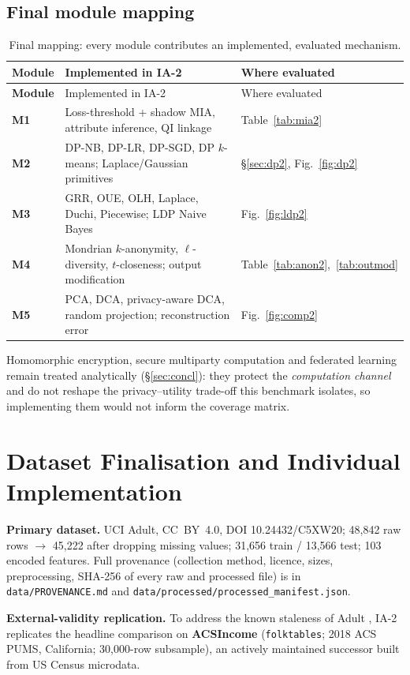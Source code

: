 \documentclass[11pt,a4paper]{article}
\begin{document}
\subsection{Final module mapping}
\begin{longtable}{>{\bfseries}p{1.4cm}p{7.4cm}p{4.3cm}}
\caption{Final mapping: every module contributes an implemented, evaluated mechanism.}\label{tab:map2}\\
\toprule Module & Implemented in IA-2 & Where evaluated\\ \midrule
\endfirsthead \toprule Module & Implemented in IA-2 & Where evaluated\\ \midrule \endhead
M1 & Loss-threshold + shadow MIA, attribute inference, QI linkage & Table~\ref{tab:mia2}\\
M2 & DP-NB, DP-LR, DP-SGD, DP $k$-means; Laplace/Gaussian primitives & \S\ref{sec:dp2}, Fig.~\ref{fig:dp2}\\
M3 & GRR, OUE, OLH, Laplace, Duchi, Piecewise; LDP Naive Bayes & Fig.~\ref{fig:ldp2}\\
M4 & Mondrian $k$-anonymity, $\ell$-diversity, $t$-closeness; output modification & Table~\ref{tab:anon2},~\ref{tab:outmod}\\
M5 & PCA, DCA, privacy-aware DCA, random projection; reconstruction error & Fig.~\ref{fig:comp2}\\
\bottomrule
\end{longtable}
Homomorphic encryption, secure multiparty computation and federated learning
remain treated analytically (\S\ref{sec:concl}): they protect the \emph{computation
channel} and do not reshape the privacy--utility trade-off this benchmark isolates,
so implementing them would not inform the coverage matrix.

\section{Dataset Finalisation and Individual Implementation}\label{sec:data2}
\textbf{Primary dataset.} UCI Adult, CC~BY~4.0, DOI 10.24432/C5XW20; 48{,}842 raw
rows $\to$ 45{,}222 after dropping missing values; 31{,}656 train / 13{,}566 test;
103 encoded features. Full provenance (collection method, licence, sizes,
preprocessing, SHA-256 of every raw and processed file) is in
\texttt{data/PROVENANCE.md} and \texttt{data/processed/processed\_manifest.json}.

\noindent\textbf{External-validity replication.} To address the known staleness of
Adult \citep{ding2021retiring}, IA-2 replicates the headline comparison on
\textbf{ACSIncome} (\texttt{folktables}; 2018 ACS PUMS, California; 30{,}000-row
subsample), an actively maintained successor built from US Census microdata.
\end{document}
